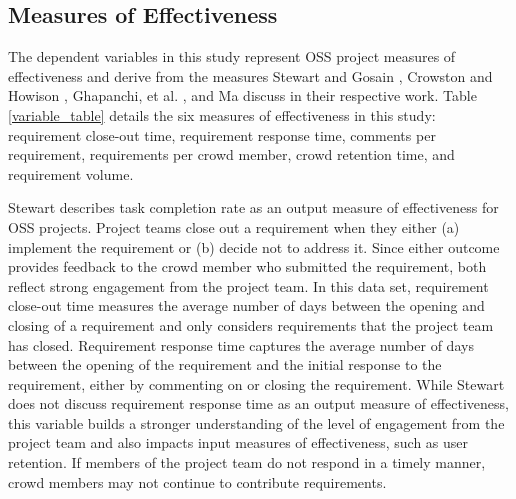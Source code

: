 \subsection{Measures of Effectiveness}
\label{measures_of_effectiveness}

The dependent variables in this study represent OSS project measures of effectiveness and derive from the measures Stewart and Gosain \cite{stewart}, Crowston and Howison \cite{crowston}, Ghapanchi, et al. \cite{ghapanchi}, and Ma \cite{ma} discuss in their respective work. Table \ref{variable_table} details the six measures of effectiveness in this study: requirement close-out time, requirement response time, comments per requirement, requirements per crowd member, crowd retention time, and requirement volume. 

Stewart \cite{stewart} describes task completion rate as an output measure of effectiveness for OSS projects. Project teams close out a requirement when they either (a) implement the requirement or (b) decide not to address it. Since either outcome provides feedback to the crowd member who submitted the requirement, both reflect strong engagement from the project team. In this data set, requirement close-out time measures the average number of days between the opening and closing of a requirement and only considers requirements that the project team has closed. Requirement response time captures the average number of days between the opening of the requirement and the initial response to the requirement, either by commenting on or closing the requirement. While Stewart \cite{stewart} does not discuss requirement response time as an output measure of effectiveness, this variable builds a stronger understanding of the level of engagement from the project team and also impacts input measures of effectiveness, such as user retention. If members of the project team do not respond in a timely manner, crowd members may not continue to contribute requirements.

